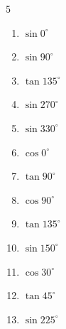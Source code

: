 \begin{multicols}{5}
\begin{enumerate}
  \item $\displaystyle \sin{0^\circ}$

        \phantom{$\displaystyle =0$}

  \item $\displaystyle \sin{90^\circ}$

        \phantom{$\displaystyle =1$}

  \item $\displaystyle \tan{135^\circ}$

        \phantom{$\displaystyle =-1$}

  \item $\displaystyle \sin{270^\circ}$

        \phantom{$\displaystyle =-1$}

  \item $\displaystyle \sin{330^\circ}$


  \item $\displaystyle \cos{0^\circ}$

        \phantom{$\displaystyle =1$}

  \item $\displaystyle \tan{90^\circ}$

        \phantom{$\displaystyle なし$}

  \item $\displaystyle \cos{90^\circ}$

        \phantom{$\displaystyle =0$}

  \item $\displaystyle \tan{135^\circ}$

        \phantom{$\displaystyle =-1$}

\columnbreak %

  \item $\displaystyle \sin{150^\circ}$


  \item $\displaystyle \cos{30^\circ}$


  \item $\displaystyle \tan{45^\circ}$

        \phantom{$\displaystyle =1$}

  \item $\displaystyle \sin{225^\circ}$


\end{enumerate}
\end{multicols}
